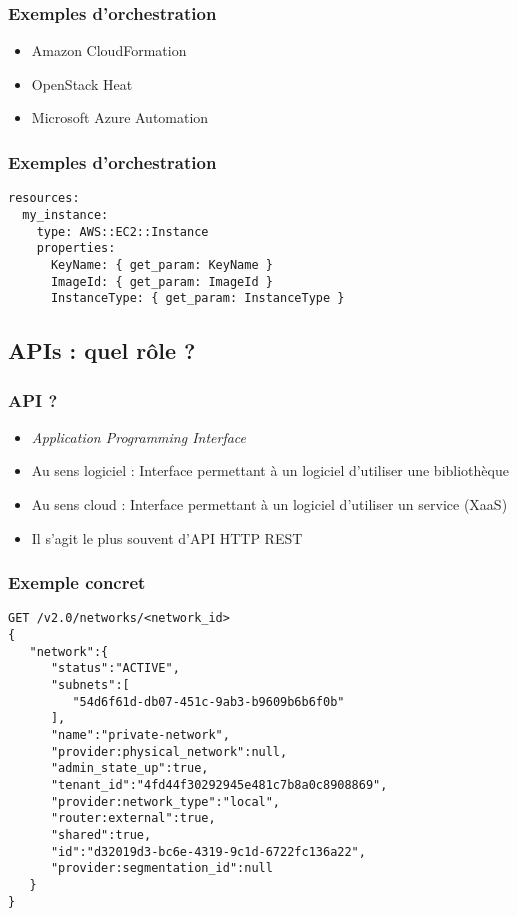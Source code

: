   \begin{frame}
    \frametitle{Exemples d'orchestration}
    \begin{itemize}
      \item Amazon CloudFormation
      \item OpenStack Heat
      \item Microsoft Azure Automation
    \end{itemize}
  \end{frame}
  
  \begin{frame}[containsverbatim]
    \frametitle{Exemples d'orchestration}
\begin{verbatim}
resources:
  my_instance:
    type: AWS::EC2::Instance
    properties:
      KeyName: { get_param: KeyName }
      ImageId: { get_param: ImageId }
      InstanceType: { get_param: InstanceType }
\end{verbatim}
  \end{frame}

  \subsection[APIs]{APIs : quel rôle ?}

  \begin{frame}
    \frametitle{API ?}
    \begin{itemize}
      \item \textit{Application Programming Interface}
      \item Au sens logiciel : Interface permettant à un logiciel d'utiliser une bibliothèque
      \item Au sens cloud : Interface permettant à un logiciel d'utiliser un service (XaaS)
      \item Il s'agit le plus souvent d'API HTTP REST
    \end{itemize}
  \end{frame}

  \begin{frame}[containsverbatim]
    \frametitle{Exemple concret}
\begin{verbatim}
GET /v2.0/networks/<network_id>
{
   "network":{
      "status":"ACTIVE",
      "subnets":[
         "54d6f61d-db07-451c-9ab3-b9609b6b6f0b"
      ],
      "name":"private-network",
      "provider:physical_network":null,
      "admin_state_up":true,
      "tenant_id":"4fd44f30292945e481c7b8a0c8908869",
      "provider:network_type":"local",
      "router:external":true,
      "shared":true,
      "id":"d32019d3-bc6e-4319-9c1d-6722fc136a22",
      "provider:segmentation_id":null
   }
}
\end{verbatim}
  \end{frame}

